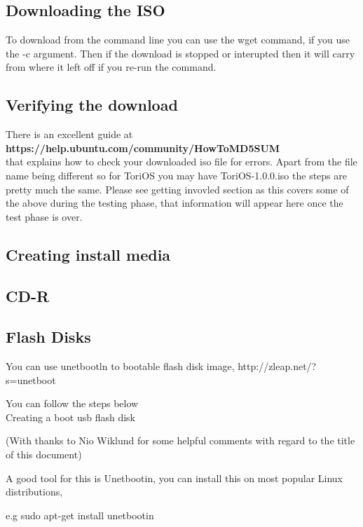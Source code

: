 \documentclass[12pt,a4paper]{book}
\begin{document}
\subsection{Downloading the ISO}
To download from the command line you can use the wget command, if you use the -c argument.  Then if the download is stopped or interupted then it will carry from where it left off if you re-run the command.\\



\subsection{Verifying the download}
There is an excellent guide at\\ \textbf{https://help.ubuntu.com/community/HowToMD5SUM} \\
that explains how to check your downloaded iso file for errors.  Apart from the file name being different so for ToriOS you may have ToriOS-1.0.0.iso the steps are pretty much the same.  
Please see getting invovled section as this covers some of the above during the testing phase,  that information will appear here once the test phase is over. 
\subsection{Creating install media}

\subsection{CD-R}


\subsection{Flash Disks}

You can use unetbootln to bootable flash disk image,   http://zleap.net/?s=unetboot

You can follow the steps below \\

Creating a boot usb flash disk

(With thanks to Nio Wiklund for some helpful comments with regard to the title of this document)

A good tool for this is Unetbootin,  you can install this on most popular Linux distributions,

e.g sudo apt-get install unetbootin
\end{document}
